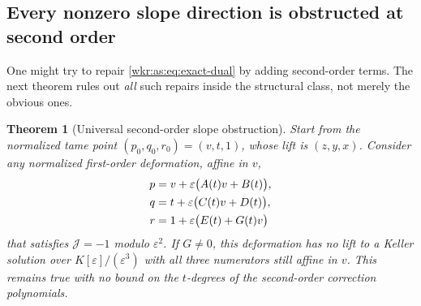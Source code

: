 \documentclass[11pt,a4paper]{article}
\numberwithin{equation}{section}
\newtheorem{theorem}{Theorem}[section]
\theoremstyle{definition}
\theoremstyle{remark}
\newcommand{\J}{\mathcal{J}}
\newcommand{\eps}{\varepsilon}
\begin{document}
\subsection{Every nonzero slope direction is obstructed at second order}

One might try to repair \eqref{wkr:as:eq:exact-dual} by adding
second-order terms. The next theorem rules out \emph{all} such repairs
inside the structural class, not merely the obvious ones.

\begin{theorem}[Universal second-order slope obstruction]
\label{wkr:as:thm:obstruction}
Start from the normalized tame point $(p_0,q_0,r_0)=(v,t,1)$, whose lift
is $(z,y,x)$. Consider any normalized first-order deformation, affine in
$v$,
\begin{align}
p&=v+\eps\bigl(A(t)v+B(t)\bigr),\notag\\
q&=t+\eps\bigl(C(t)v+D(t)\bigr),\label{wkr:as:eq:generalfirst}\\
r&=1+\eps\bigl(E(t)+G(t)v\bigr)\notag
\end{align}
that satisfies $\J=-1$ modulo $\eps^2$. If $G\ne0$, this deformation
has no lift to a Keller solution over $K[\eps]/(\eps^3)$ with all three
numerators still affine in $v$. This remains true with no bound on the
$t$-degrees of the second-order correction polynomials.
\end{theorem}
\end{document}
